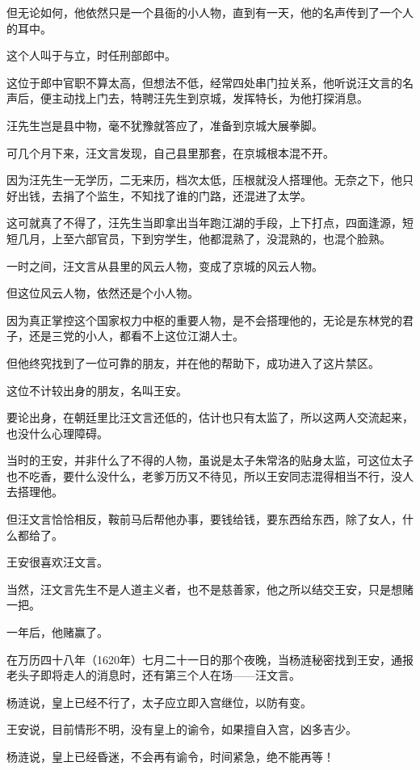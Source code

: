 \begin{multicols}{\theparacolNo}
		但无论如何，他依然只是一个县衙的小人物，直到有一天，他的名声传到了一个人的耳中。

		这个人叫于与立，时任刑部郎中。

		这位于郎中官职不算太高，但想法不低，经常四处串门拉关系，他听说汪文言的名声后，便主动找上门去，特聘汪先生到京城，发挥特长，为他打探消息。

		汪先生岂是县中物，毫不犹豫就答应了，准备到京城大展拳脚。

		可几个月下来，汪文言发现，自己县里那套，在京城根本混不开。

		因为汪先生一无学历，二无来历，档次太低，压根就没人搭理他。无奈之下，他只好出钱，去捐了个监生，不知找了谁的门路，还混进了太学。

		这可就真了不得了，汪先生当即拿出当年跑江湖的手段，上下打点，四面逢源，短短几月，上至六部官员，下到穷学生，他都混熟了，没混熟的，也混个脸熟。

		一时之间，汪文言从县里的风云人物，变成了京城的风云人物。

		但这位风云人物，依然还是个小人物。

		因为真正掌控这个国家权力中枢的重要人物，是不会搭理他的，无论是东林党的君子，还是三党的小人，都看不上这位江湖人士。

		但他终究找到了一位可靠的朋友，并在他的帮助下，成功进入了这片禁区。

		这位不计较出身的朋友，名叫王安。

		要论出身，在朝廷里比汪文言还低的，估计也只有太监了，所以这两人交流起来，也没什么心理障碍。

		当时的王安，并非什么了不得的人物，虽说是太子朱常洛的贴身太监，可这位太子也不吃香，要什么没什么，老爹万历又不待见，所以王安同志混得相当不行，没人去搭理他。

		但汪文言恰恰相反，鞍前马后帮他办事，要钱给钱，要东西给东西，除了女人，什么都给了。

		王安很喜欢汪文言。

		当然，汪文言先生不是人道主义者，也不是慈善家，他之所以结交王安，只是想赌一把。

		一年后，他赌赢了。

		在万历四十八年（1620年）七月二十一日的那个夜晚，当杨涟秘密找到王安，通报老头子即将走人的消息时，还有第三个人在场——汪文言。

		杨涟说，皇上已经不行了，太子应立即入宫继位，以防有变。

		王安说，目前情形不明，没有皇上的谕令，如果擅自入宫，凶多吉少。

		杨涟说，皇上已经昏迷，不会再有谕令，时间紧急，绝不能再等！


\end{multicols}
